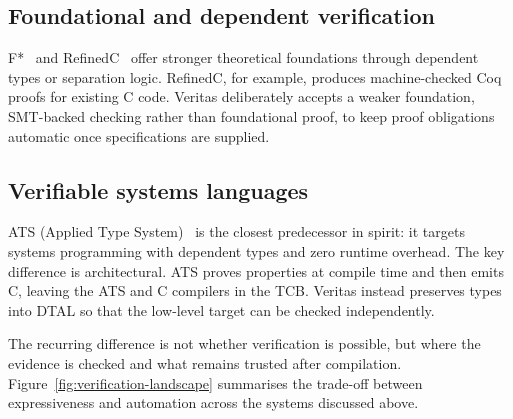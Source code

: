 \subsection{Foundational and dependent verification}
F*~\cite{Swamy2016Dependent} and RefinedC~\cite{Sammler2021RefinedC} offer stronger theoretical foundations through dependent types or separation logic. RefinedC, for example, produces machine-checked Coq proofs for existing C code. Veritas deliberately accepts a weaker foundation, SMT-backed checking rather than foundational proof, to keep proof obligations automatic once specifications are supplied.

\subsection{Verifiable systems languages}
ATS (Applied Type System)~\cite{Xi2003Applied} is the closest predecessor in spirit: it targets systems programming with dependent types and zero runtime overhead. The key difference is architectural. ATS proves properties at compile time and then emits C, leaving the ATS and C compilers in the TCB. Veritas instead preserves types into DTAL so that the low-level target can be checked independently.

The recurring difference is not whether verification is possible, but where the evidence is checked and what remains trusted after compilation. Figure~\ref{fig:verification-landscape} summarises the trade-off between expressiveness and automation across the systems discussed above.

